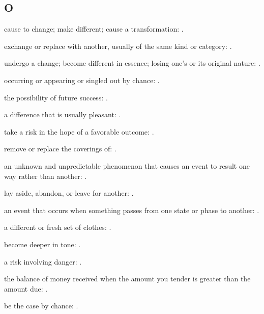 \subsection*{O}

  cause to change; make different; cause a transformation:   .

  exchange or replace with another, usually of the same kind or category:   .

  undergo a change; become different in essence; losing one's or its original nature: .

  occurring or appearing or singled out by chance:   .

  the possibility of future success:   .

  a difference that is usually pleasant:   .

  take a risk in the hope of a favorable outcome:   .

  remove or replace the coverings of: .

  an unknown and unpredictable phenomenon that causes an event to result one way rather than another:   .

  lay aside, abandon, or leave for another:   .

  an event that occurs when something passes from one state or phase to another:   .

  a different or fresh set of clothes: .

  become deeper in tone:   .

  a risk involving danger: .

  the balance of money received when the amount you tender is greater than the amount due: .

  be the case by chance: .

